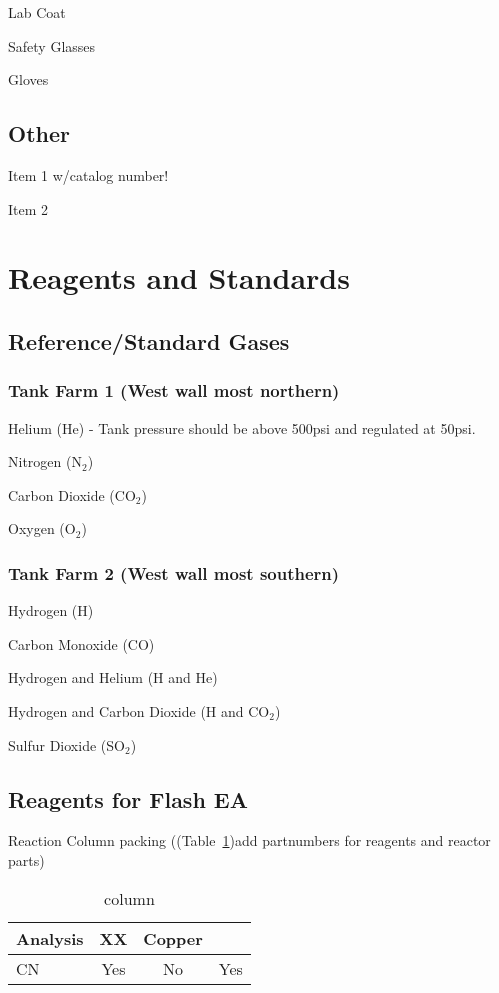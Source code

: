 \documentclass[12pt]{../SOP3_beta}\usepackage[]{graphicx}\usepackage[]{color}
\begin{document}
\NP Lab Coat

\NP Safety Glasses

\NP Gloves

\subsection{Other}

\NP Item 1 w/catalog number!

\NP Item 2

\section{Reagents and Standards}

\subsection{Reference/Standard Gases}

\subsubsection{Tank Farm 1 (West wall most northern)}

\NP Helium (He) - Tank pressure should be above 500psi and regulated at 50psi.

\NP Nitrogen (N$_2$)

\NP Carbon Dioxide (CO$_2$)

\NP Oxygen (O$_2$)

\subsubsection{Tank Farm 2 (West wall most southern)}

\NP Hydrogen (H)

\NP Carbon Monoxide (CO)

\NP Hydrogen and Helium (H and He)

\NP Hydrogen and Carbon Dioxide (H and CO$_2$)

\NP Sulfur Dioxide (SO$_2$)

\subsection{Reagents for Flash EA}

\NP Reaction Column packing ((Table~\ref{column})add partnumbers for reagents and reactor parts)

\begin{table}[h]
\label{column}
\caption{column}
\centering
\begin{tabular}{lccc} \hline
Analysis      & XX    & Copper  & \\ \hline\hline
CN            & Yes   & No      & Yes \\ \hline


\end{tabular}
\end{table}
\end{document}
